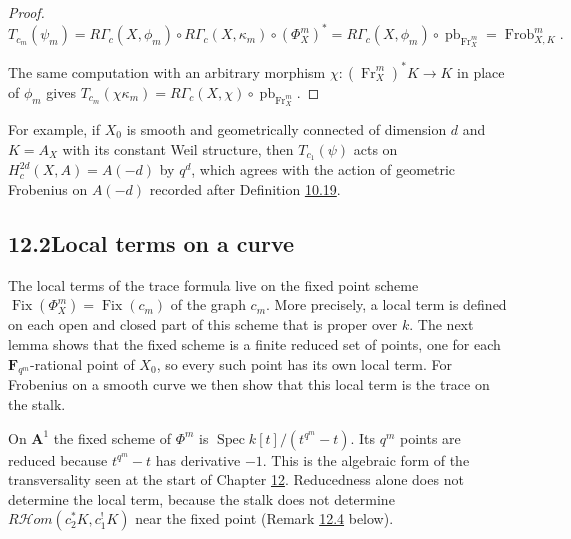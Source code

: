 \documentclass[11pt]{article}
\providecommand{\Fix}{}\renewcommand{\Fix}{\operatorname{Fix}}
\providecommand{\cHom}{}\renewcommand{\cHom}{R\mathcal{H}\!om}
\begin{document}
\begin{proof}[{Proof}]
\[
T_{c_m}(\psi_m)=R\Gamma_c(X,\phi_m)\circ R\Gamma_c(X,\kappa_m)\circ(\Phi_X^m)^*
=R\Gamma_c(X,\phi_m)\circ\operatorname{pb}_{\operatorname{Fr}_X^m}
=\operatorname{Frob}_{X,K}^m .
\]

The same computation with an arbitrary morphism \(\chi:(\operatorname{Fr}_X^m)^*K\to K\) in place of \(\phi_m\) gives \(T_{c_m}(\chi\kappa_m)=R\Gamma_c(X,\chi)\circ\operatorname{pb}_{\operatorname{Fr}_X^m}\).
\end{proof}

\label{bp236}%
For example, if \(X_0\) is smooth and geometrically connected of dimension \(d\) and \(K=A_X\) with its constant Weil structure, then \(T_{c_1}(\psi)\) acts on \(H^{2d}_c(X,A)=A(-d)\) by \(q^d\), which agrees with the action of geometric Frobenius on \(A(-d)\) recorded after Definition \hyperref[bp158]{10.19}.


\subsection*{\texorpdfstring{12.2\quad Local terms on a curve}{12.2 Local terms on a curve}}
\label{bp237}%
\label{bp238}%
The local terms of the trace formula live on the fixed point scheme \(\Fix(\Phi_X^m)=\Fix(c_m)\) of the graph \(c_m\). More precisely, a local term is defined on each open and closed part of this scheme that is proper over \(k\). The next lemma shows that the fixed scheme is a finite reduced set of points, one for each \(\mathbf F_{q^m}\)-rational point of \(X_0\), so every such point has its own local term. For Frobenius on a smooth curve we then show that this local term is the trace on the stalk.

On \(\mathbf A^1\) the fixed scheme of \(\Phi^m\) is \(\operatorname{Spec}k[t]/(t^{q^m}-t)\). Its \(q^m\) points are reduced because \(t^{q^m}-t\) has derivative \(-1\). This is the algebraic form of the transversality seen at the start of Chapter \hyperref[bp226]{12}. Reducedness alone does not determine the local term, because the stalk does not determine \(\cHom(c_2^*K,c_1^!K)\) near the fixed point (Remark \hyperref[bp239]{12.4} below).
\end{document}
